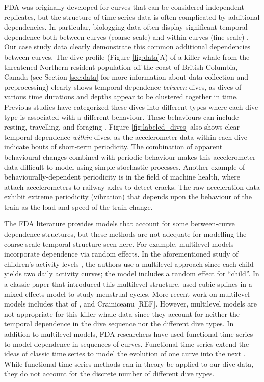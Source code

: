 FDA was originally developed for curves that can be considered independent replicates, but the structure of time-series data is often complicated by additional dependencies. In particular, biologging data often display significant temporal dependence both between curves (coarse-scale) and within curves (fine-scale) \citep{Barajas:2017,Adam:2019}. Our case study data clearly demonstrate this common additional dependencies between curves. The dive profile (Figure \ref{fig:data}A) of a killer whale from the threatened Northern resident population off the coast of British Columbia, Canada (see Section \ref{sec:data} for more information about data collection and preprocessing) clearly shows temporal dependence \textit{between} dives, as dives of various time durations and depths appear to be clustered together in time. Previous studies have categorized these dives into different types where each dive type is associated with a different behaviour. These behaviours can include resting, travelling, and foraging \citep{Tennessen:2019b}.
Figure {\ref{fig:labeled_dives}} also shows clear temporal dependence \textit{within} dives, as the accelerometer data within each dive indicate bouts of short-term periodicity. The combination of apparent behavioural changes combined with periodic behaviour makes this accelerometer data difficult to model using simple stochastic processes. Another example of behaviourally-dependent periodicity is in the field of machine health, where \citet{Lucero:2019} attach accelerometers to railway axles to detect cracks. The raw acceleration data exhibit extreme periodicity (vibration) that depends upon the behaviour of the train as the load and speed of the train change.

The FDA literature provides models that account for some between-curve dependence structures, but these methods are not adequate for modelling the coarse-scale temporal structure seen here. For example, multilevel models incorporate dependence via random effects. In the aforementioned study of children's activity levels \citep{Morris:2007}, the authors use a multilevel approach since each child yields two daily activity curves; the model includes a random effect for ``child''. In a classic paper that introduced this multilevel structure,  \cite{Bromback:1998} used cubic splines in a mixed effects model to study menstrual cycles. More recent work on multilevel models includes that of \cite{di:2009}, \cite{chen:2012} and Crainiceanu [REF]. However, multilevel models are not appropriate for this killer whale data since they account for neither the temporal dependence in the dive sequence nor the different dive types. 
In addition to multilevel models, FDA researchers have used functional time series to model dependence in sequences of curves. Functional time series extend the ideas of classic time series to model the evolution of one curve into the next \citep{Kokoszka:2018}. While functional time series methods can in theory be applied to our dive data, they do not account for the discrete number of different dive types.
 
